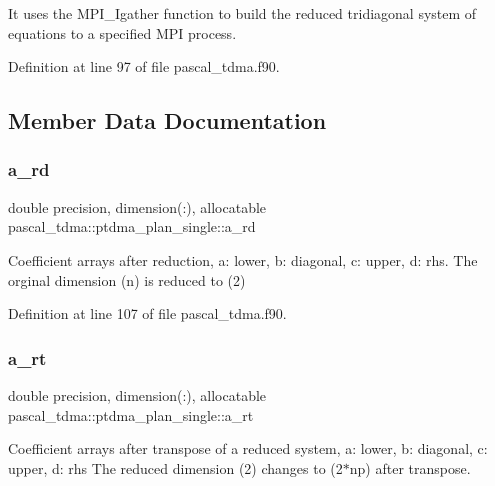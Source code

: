It uses the M\+P\+I\+\_\+\+Igather function to build the reduced tridiagonal system of equations to a specified M\+PI process. 

Definition at line 97 of file pascal\+\_\+tdma.\+f90.



\subsection{Member Data Documentation}
\mbox{\label{structpascal__tdma_1_1ptdma__plan__single_a732d93dcbef429c1396a6f7ace9cefa6}} 
\subsubsection{\texorpdfstring{a\_rd}{a\_rd}}
{\footnotesize\ttfamily double precision, dimension(\+:), allocatable pascal\+\_\+tdma\+::ptdma\+\_\+plan\+\_\+single\+::a\+\_\+rd}



Coefficient arrays after reduction, a\+: lower, b\+: diagonal, c\+: upper, d\+: rhs. The orginal dimension (n) is reduced to (2) 



Definition at line 107 of file pascal\+\_\+tdma.\+f90.

\mbox{\label{structpascal__tdma_1_1ptdma__plan__single_ad8bed95f594c23d7df9467e204025a74}} 
\subsubsection{\texorpdfstring{a\_rt}{a\_rt}}
{\footnotesize\ttfamily double precision, dimension(\+:), allocatable pascal\+\_\+tdma\+::ptdma\+\_\+plan\+\_\+single\+::a\+\_\+rt}



Coefficient arrays after transpose of a reduced system, a\+: lower, b\+: diagonal, c\+: upper, d\+: rhs The reduced dimension (2) changes to (2$\ast$np) after transpose. 



